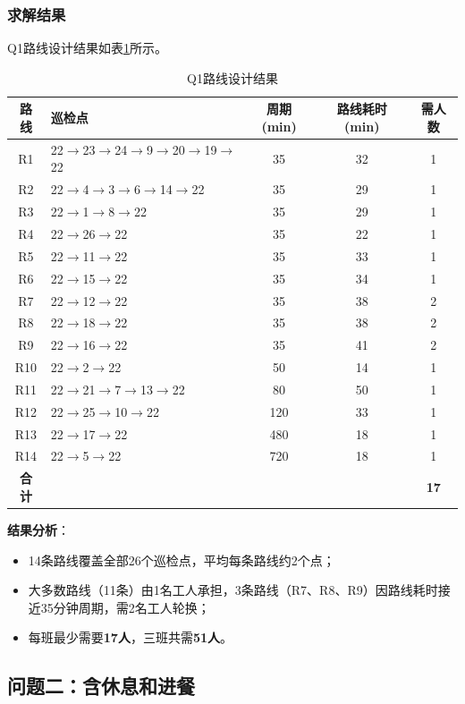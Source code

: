 \documentclass[12pt,a4paper]{article}
\begin{document}
\subsubsection{求解结果}

Q1路线设计结果如表\ref{tab:q1_routes}所示。

\begin{table}[H]
\centering
\caption{Q1路线设计结果}
\label{tab:q1_routes}
\small
\begin{tabular}{clccc}
\toprule
\textbf{路线} & \textbf{巡检点} & \textbf{周期(min)} & \textbf{路线耗时(min)} & \textbf{需人数} \\
\midrule
R1 & 22$\to$23$\to$24$\to$9$\to$20$\to$19$\to$22 & 35 & 32 & 1 \\
R2 & 22$\to$4$\to$3$\to$6$\to$14$\to$22 & 35 & 29 & 1 \\
R3 & 22$\to$1$\to$8$\to$22 & 35 & 29 & 1 \\
R4 & 22$\to$26$\to$22 & 35 & 22 & 1 \\
R5 & 22$\to$11$\to$22 & 35 & 33 & 1 \\
R6 & 22$\to$15$\to$22 & 35 & 34 & 1 \\
R7 & 22$\to$12$\to$22 & 35 & 38 & 2 \\
R8 & 22$\to$18$\to$22 & 35 & 38 & 2 \\
R9 & 22$\to$16$\to$22 & 35 & 41 & 2 \\
R10 & 22$\to$2$\to$22 & 50 & 14 & 1 \\
R11 & 22$\to$21$\to$7$\to$13$\to$22 & 80 & 50 & 1 \\
R12 & 22$\to$25$\to$10$\to$22 & 120 & 33 & 1 \\
R13 & 22$\to$17$\to$22 & 480 & 18 & 1 \\
R14 & 22$\to$5$\to$22 & 720 & 18 & 1 \\
\midrule
\textbf{合计} & & & & \textbf{17} \\
\bottomrule
\end{tabular}
\end{table}

\textbf{结果分析}：
\begin{itemize}
    \item 14条路线覆盖全部26个巡检点，平均每条路线约2个点；
    \item 大多数路线（11条）由1名工人承担，3条路线（R7、R8、R9）因路线耗时接近35分钟周期，需2名工人轮换；
    \item 每班最少需要\textbf{17人}，三班共需\textbf{51人}。
\end{itemize}

\subsection{问题二：含休息和进餐}
\end{document}
